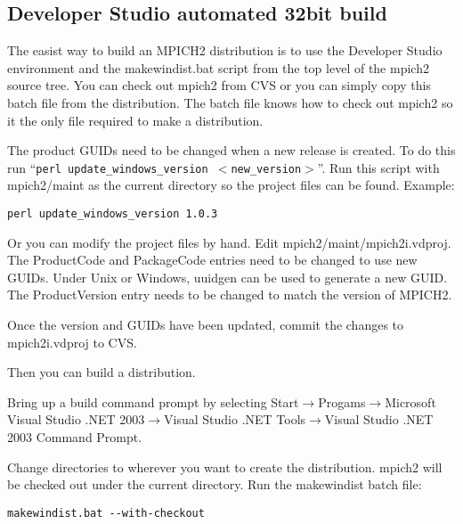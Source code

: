 \documentclass[dvipdfm,11pt]{article}
\begin{document}
\subsection{Developer Studio automated 32bit build}
\label{sec:devstudiobuild}

The easist way to build an MPICH2 distribution is to use the Developer Studio environment
and the makewindist.bat script from the top level of the mpich2 source tree.  You can check
out mpich2 from CVS or you can simply copy this batch file from the distribution.  The batch
file knows how to check out mpich2 so it the only file required to make a distribution.

The product GUIDs need to be changed when a new release is created.  To do this run 
``\texttt{perl update\_windows\_version $<$new\_version$>$}''.  Run this script with mpich2/maint 
as the current directory so the project files can be found.  Example:
\begin{verbatim}
perl update_windows_version 1.0.3
\end{verbatim}

Or you can modify the project files by hand.  Edit mpich2/maint/mpich2i.vdproj.  The ProductCode
and PackageCode entries need to be changed to use new GUIDs.  Under Unix or Windows, uuidgen can 
be used to generate a new GUID.  The ProductVersion entry needs to be changed to match the 
version of MPICH2.

Once the version and GUIDs have been updated, commit the changes to mpich2i.vdproj to CVS.

Then you can build a distribution.

Bring up a build command prompt by selecting Start$\to$Progams$\to$Microsoft Visual Studio 
.NET 2003$\to$Visual Studio .NET Tools$\to$Visual Studio .NET 2003 Command Prompt.

Change directories to wherever you want to create the distribution.  mpich2 will be checked 
out under the current directory.  Run the makewindist batch file:

\begin{verbatim}
makewindist.bat --with-checkout
\end{verbatim}
\end{document}
